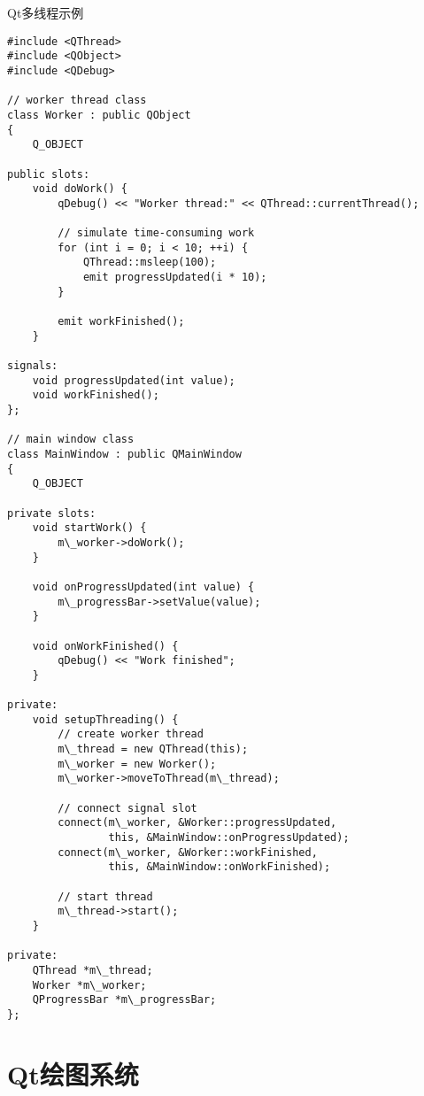 \documentclass[UTF8,aspectratio=169]{beamer}
\begin{document}
\begin{frame}[fragile]{Qt多线程示例}
    \begin{lstlisting}
#include <QThread>
#include <QObject>
#include <QDebug>

// worker thread class
class Worker : public QObject
{
    Q_OBJECT

public slots:
    void doWork() {
        qDebug() << "Worker thread:" << QThread::currentThread();

        // simulate time-consuming work
        for (int i = 0; i < 10; ++i) {
            QThread::msleep(100);
            emit progressUpdated(i * 10);
        }

        emit workFinished();
    }

signals:
    void progressUpdated(int value);
    void workFinished();
};

// main window class
class MainWindow : public QMainWindow
{
    Q_OBJECT

private slots:
    void startWork() {
        m\_worker->doWork();
    }

    void onProgressUpdated(int value) {
        m\_progressBar->setValue(value);
    }

    void onWorkFinished() {
        qDebug() << "Work finished";
    }

private:
    void setupThreading() {
        // create worker thread
        m\_thread = new QThread(this);
        m\_worker = new Worker();
        m\_worker->moveToThread(m\_thread);

        // connect signal slot
        connect(m\_worker, &Worker::progressUpdated,
                this, &MainWindow::onProgressUpdated);
        connect(m\_worker, &Worker::workFinished,
                this, &MainWindow::onWorkFinished);

        // start thread
        m\_thread->start();
    }

private:
    QThread *m\_thread;
    Worker *m\_worker;
    QProgressBar *m\_progressBar;
};
    \end{lstlisting}
\end{frame}

\section{Qt绘图系统}
\end{document}
